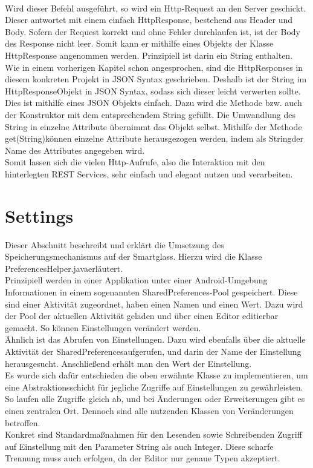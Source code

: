 \\
Wird dieser Befehl ausgeführt, so wird ein Http-Request an den Server geschickt. Dieser antwortet mit einem einfach HttpResponse, bestehend aus Header und Body. Sofern der Request korrekt und ohne Fehler durchlaufen ist, ist der Body des Response nicht leer. Somit kann er mithilfe eines Objekts der Klasse HttpResponse angenommen werden. Prinzipiell ist darin ein String enthalten. 
\\
Wie in einem vorherigen Kapitel schon angesprochen, sind die HttpResponses in diesem konkreten Projekt in JSON Syntax geschrieben. Deshalb ist der String im \glqq HttpResponse\grqq Objekt in JSON Syntax, sodass sich dieser leicht verwerten sollte. Dies ist mithilfe eines JSON Objekts einfach. Dazu wird die Methode bzw. auch der Konstruktor mit dem entsprechendem String gefüllt. Die Umwandlung des String in einzelne Attribute übernimmt das Objekt selbst. Mithilfe der Methode \glqq get(String)\grqq können einzelne Attribute herausgezogen werden, indem als \glqq String\grqq der Name des Attributes angegeben wird.
\\
Somit lassen sich die vielen Http-Aufrufe, also die Interaktion mit den hinterlegten REST Services, sehr einfach und elegant nutzen und verarbeiten.

\section{Settings}
\label{sec:settings}
Dieser Abschnitt beschreibt und erklärt die Umsetzung des Speicherungsmechanismus auf der Smartglass. Hierzu wird die Klasse \glqq PreferencesHelper.java\grqq erläutert. 
\\
Prinzipiell werden in einer Applikation unter einer Android-Umgebung Informationen in einem sogenannten SharedPreferences-Pool gespeichert. Diese sind einer Aktivität zugeordnet, haben einen Namen und einen Wert. Dazu wird der Pool der aktuellen Aktivität geladen und über einen Editor editierbar gemacht. So können Einstellungen verändert werden. 
\\
Ähnlich ist das Abrufen von Einstellungen. Dazu wird ebenfalls über die aktuelle Aktivität der \glqq SharedPreferences\grqq aufgerufen, und darin der Name der Einstellung herausgesucht. Anschließend erhält man den Wert der Einstellung. 
\\
Es wurde sich dafür entschieden die oben erwähnte Klasse zu implementieren, um eine Abstraktionsschicht für jegliche Zugriffe auf Einstellungen zu gewährleisten. So laufen alle Zugriffe gleich ab, und bei Änderungen oder Erweiterungen gibt es einen zentralen Ort. Dennoch sind alle nutzenden Klassen von Veränderungen betroffen. 
\\
Konkret sind Standardmaßnahmen für den Lesenden sowie Schreibenden Zugriff auf Einstellung mit den Parameter String als auch Integer. Diese scharfe Trennung muss auch erfolgen, da der Editor nur genaue Typen akzeptiert. 

